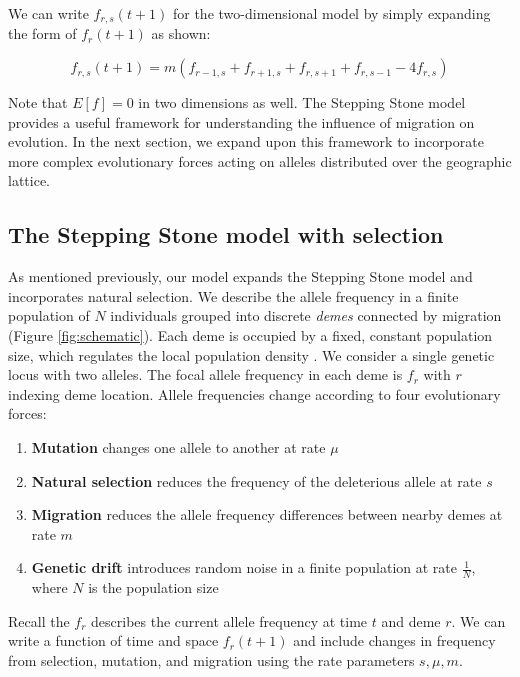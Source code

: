 We can write $f_{r,s}(t+1)$ for the two-dimensional model by simply expanding the form of $f_r(t+1)$ as shown:


\begin{equation} \label{eq:stepstone}
    f_{r,s}(t+1) = m(f_{r-1,s} + f_{r+1,s} + f_{r,s+1} + f_{r,s-1} - 4f_{r,s})
\end{equation}


Note that $E[f] = 0$ in two dimensions as well. The Stepping Stone model provides a useful framework for understanding the influence of migration on evolution. In the next section, we expand upon this framework to incorporate more complex evolutionary forces acting on alleles distributed over the geographic lattice.  


\subsection{The Stepping Stone model with selection} \label{"section:our_model"}

As mentioned previously, our model expands the Stepping Stone model and incorporates natural selection. We describe the allele frequency in a finite population of $N$ individuals grouped into discrete \textit{demes} connected by migration (Figure \ref{fig:schematic}). Each deme is occupied by a fixed, constant population size, which regulates the local population density \cite{felsenstein_pain_1975}. We consider a single genetic locus with two alleles. The focal allele frequency in each deme is $f_r$ with $r$ indexing deme location. Allele frequencies change according to four evolutionary forces:


\begin{enumerate}
    \item \textbf{Mutation} changes one allele to another at rate $\mu$
    \item \textbf{Natural selection} reduces the frequency of the deleterious allele at rate $s$
    \item \textbf{Migration} reduces the allele frequency differences between nearby demes at rate $m$
    \item \textbf{Genetic drift} introduces random noise in a finite population at rate $\frac{1}{N}$, \\ where $N$ is the population size
\end{enumerate}


Recall the $f_r$ describes the current allele frequency at time $t$ and deme $r$. We can write a function of time and space $f_r(t+1)$ and include changes in frequency from selection, mutation, and migration using the rate parameters $s, \mu, m$.

